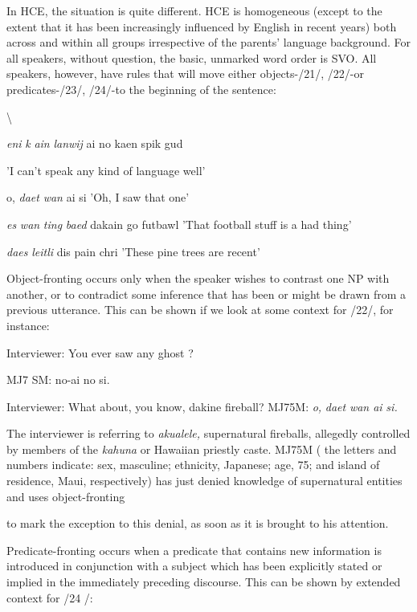 In HCE, the situation is quite different. HCE is homogeneous (except to the extent that it has been increasingly influenced by English in recent years) both across and within all groups irrespective of the parents' language background. For all speakers, without question, the basic, unmarked word order is SVO. All speakers, however, have rules that will move either objects-/21/, /22/-or predicates-/23/, /24/-to the beginning of the sentence:

{\textbackslash}


\ea\label{ex:21}
\textit{eni} \textit{k} \textit{ain} \textit{lanwij} ai no kaen spik gud
\glt
\z

'I can't speak any kind of language well'

\ea\label{ex:22}
o, \textit{daet} \textit{wan} ai si 'Oh, I saw that one'
\glt
\z

\ea\label{ex:23}
\textit{es} \textit{wan} \textit{ting} \textit{baed} dakain go futbawl 'That football stuff is a had thing'
\glt
\z

\ea\label{ex:24}
\textit{daes} \textit{leitli} dis pain chri 'These pine trees are recent'
\glt
\z

Object-fronting occurs only when the speaker wishes to contrast one NP with another, or to contradict some inference that has been or might be drawn from a previous utterance. This can be shown if we look at some context for /22/, for instance:

\ea\label{ex:25}
Interviewer: You ever saw any ghost ?
\glt
\z

MJ7 SM: no-ai no si.

Interviewer: What about, you know, dakine fireball? MJ75M: \textit{o,} \textit{daet} \textit{wan ai} \textit{si.}

The interviewer is referring to \textit{akualele,} supernatural fireballs, allegedly controlled by members of the \textit{kahuna} or Hawaiian priestly caste. MJ75M ( the letters and numbers indicate: sex, masculine; ethnicity, Japanese; age, 75; and island of residence, Maui, respectively) has just denied knowledge of supernatural entities and uses object-fronting

to mark the exception to this denial, as soon as it is brought to his attention.

Predicate-fronting occurs when a predicate that contains new information is introduced in conjunction with a subject which has been explicitly stated or implied in the immediately preceding discourse. This can be shown by extended context for /24 /:

